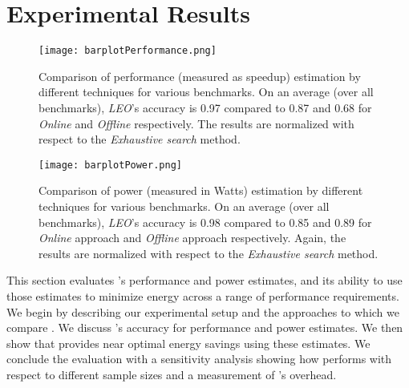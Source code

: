 \section{Experimental Results}
\label{sec:experiment}
\begin{figure*}
\begin{center}
 \texttt{[image: barplotPerformance.png]}
 \vspace{-0.35em}
 \caption{Comparison of performance (measured as speedup) estimation
   by different techniques for various benchmarks.    On an average
   (over all benchmarks), \textit{LEO}'s accuracy is 0.97 compared to
   0.87 and 0.68 for \textit{Online} and \textit{Offline}
   respectively. The results are normalized with respect to the
   \textit{Exhaustive search} method.  }
\label{fig:barperf}
\end{center}
\end{figure*}
\begin{figure*}
\begin{center}
 \texttt{[image: barplotPower.png]}
 \vspace{-0.35em}
 \caption{Comparison of power (measured in Watts) estimation by
   different techniques for various benchmarks.  On an average (over all benchmarks),
   \textit{LEO}'s accuracy is 0.98 compared to 0.85 and 0.89 for
   \textit{Online} approach and \textit{Offline} approach
   respectively. Again, the results are normalized with respect to the
   \textit{Exhaustive search} method.}
\label{fig:barpower}
\end{center}
\end{figure*}



This section evaluates \SYSTEM{}'s performance and power estimates,
and its ability to use those estimates to minimize energy across a
range of performance requirements.  We begin by describing our
experimental setup and the approaches to which we compare \SYSTEM{}.
We discuss \SYSTEM{}'s accuracy for performance and power estimates.
We then show that \SYSTEM{} provides near optimal energy savings using
these estimates.  We conclude the evaluation with a sensitivity
analysis showing how \SYSTEM{} performs with respect to different
sample sizes and a measurement of \SYSTEM{}'s overhead.

